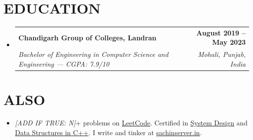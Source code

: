 \documentclass[letterpaper,11pt]{article}
\makeatletter
\newcommand{\resumeItem}[1]{\item\small{{#1 \vspace{-2pt}}}}
\newcommand{\resumeSubheading}[4]{
  \vspace{-2pt}\item
    \begin{tabular*}{1.0\textwidth}[t]{l@{\extracolsep{\fill}}r}
      \textbf{\large#1} & \textbf{\small #2} \\
      \textit{\small#3} & \textit{\small #4} \\
    \end{tabular*}\vspace{-7pt}
}
\newcommand{\resumeSubHeadingListStart}{\begin{itemize}[leftmargin=0.0in, label={}]}
\newcommand{\resumeSubHeadingListEnd}{\end{itemize}}
\newcommand{\resumeItemListStart}{\begin{itemize}}
\newcommand{\resumeItemListEnd}{\end{itemize}\vspace{-5pt}}
\makeatother
\begin{document}
\section{EDUCATION}
  \resumeSubHeadingListStart
    \resumeSubheading
      {Chandigarh Group of Colleges, Landran}{August 2019 -- May 2023}
      {Bachelor of Engineering in Computer Science and Engineering — CGPA: 7.9/10}{Mohali, Punjab, India}
  \resumeSubHeadingListEnd

\vspace{-6pt}

\section{ALSO}
    \vspace{2pt}
    \resumeItemListStart
        \resumeItem{\textit{[ADD IF TRUE: N]}+ problems on \href{https://leetcode.com/u/sachinkumar6174/}{LeetCode}. Certified in \href{http://ninjasfiles.s3.amazonaws.com/certificate18894980e4209379ac28665887f78da42bac5c2.pdf}{System Design} and \href{https://ninjasfiles.s3.amazonaws.com/certificate19853580c201378561a01f48ae87f59e9220db2.pdf}{Data Structures in C++}. I write and tinker at \href{https://www.sachinserver.in}{sachinserver.in}.}
    \resumeItemListEnd
\end{document}
